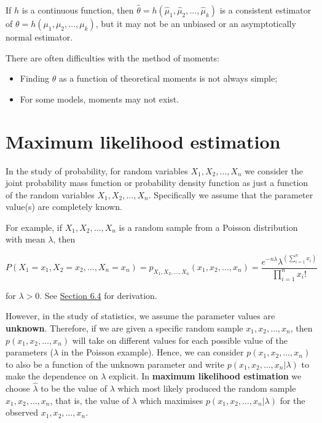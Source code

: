 \documentclass[
]{book}
\providecommand{\tightlist}{%
  \setlength{\itemsep}{0pt}\setlength{\parskip}{0pt}}
\begin{document}
If \(h\) is a continuous function, then \(\hat{\theta} = h(\hat{\mu}_1, \hat{\mu}_2, \dots, \hat{\mu}_k)\) is a consistent estimator of \(\theta = h(\mu_1,\mu_2,\dots,\mu_k)\), but it may not be an unbiased or an asymptotically normal estimator.

There are often difficulties with the method of moments:

\begin{itemize}
\tightlist
\item
  Finding \(\theta\) as a function of theoretical moments is not always simple;\\
\item
  For some models, moments may not exist.
\end{itemize}

\hypertarget{MLE:MLE}{%
\section{Maximum likelihood estimation}\label{MLE:MLE}}

In the study of probability, for random variables \(X_1,X_2,\dots,X_n\) we consider the joint probability mass function or probability density function as just a function of the random variables \(X_1,X_2,\dots,X_n\). Specifically we assume that the parameter value(s) are completely known.

For example, if \(X_1,X_2,\dots,X_n\) is a random sample from a Poisson distribution with mean \(\lambda\), then

\[P (X_1 =x_1, X_2 = x_2, \ldots, X_n = x_n) = p_{X_1,X_2,\dots,X_n}(x_1,x_2,\dots,x_n) = \frac{ e^{-n\lambda} \lambda^{\left( \sum\limits_{i=1}^n x_i \right)} }{\prod\limits_{i=1}^n x_i!}\]

for \(\lambda > 0\). See \protect\hyperlink{jointdis:independent}{Section 6.4} for derivation.

However, in the study of statistics, we assume the parameter values are \textbf{unknown}. Therefore, if we are given a specific random sample \(x_1,x_2,\dots,x_n\), then \(p(x_1,x_2,\dots,x_n)\) will take on different values for each possible value of the parameters (\(\lambda\) in the Poisson example). Hence, we can consider \(p(x_1,x_2,\dots,x_n)\) to also be a function of the unknown parameter and write \(p(x_1,x_2,\dots,x_n|\lambda)\) to make the dependence on \(\lambda\) explicit. In \textbf{maximum likelihood estimation} we choose \(\hat{\lambda}\) to be the value of \(\lambda\) which most likely produced the random sample \(x_1,x_2,\dots,x_n\), that is, the value of \(\lambda\) which maximises \(p(x_1, x_2, \ldots, x_n |\lambda)\) for the observed \(x_1,x_2,\dots,x_n\).
\end{document}
